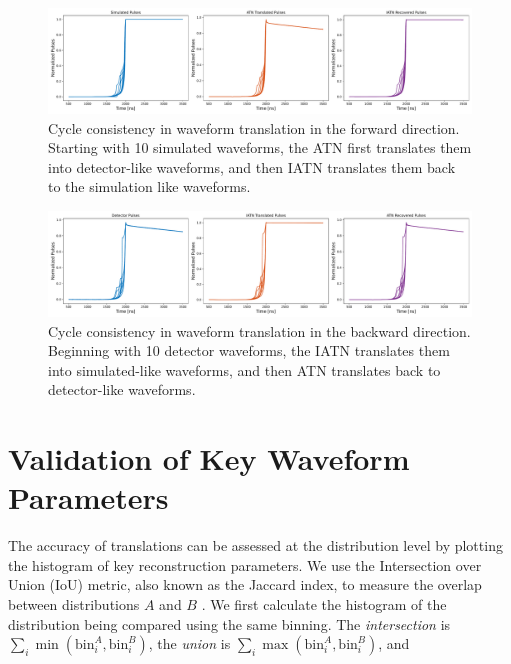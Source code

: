 \begin{figure}%
    \centering
    \includegraphics[width=0.99\linewidth]{ch8/figs/SEP_result_comp_1x3_cycle_BAB.pdf}
    \caption{Cycle consistency in waveform translation in the forward direction. Starting with 10 simulated waveforms, the ATN first translates them into detector-like waveforms, and then IATN translates them back to the simulation like waveforms.}
    \label{fig:cycle_bab}
\end{figure}

\begin{figure}%
    \centering
    \includegraphics[width=0.99\linewidth]{ch8/figs/SEP_result_comp_1x3_cycle_ABA.pdf}
    \caption{Cycle consistency in waveform translation in the backward direction. Beginning with 10 detector waveforms, the IATN translates them into simulated-like waveforms, and then ATN translates back to detector-like waveforms.}
    \label{fig:cycle_aba}
\end{figure}

\section{Validation of Key Waveform Parameters}
 The accuracy of translations can be assessed at the distribution level by plotting the histogram of key reconstruction parameters. We use the Intersection over Union (IoU) metric, also known as the Jaccard index, to measure the overlap between distributions $A$ and $B$ \cite{murphy1996finley, jaccard_index}. We first calculate the histogram of the distribution being compared using the same binning. The \textit{intersection} is $\sum_{i} \min(\text{bin}_i^A, \text{bin}_i^B)$, the \textit{union} is $\sum_{i} \max(\text{bin}_i^A, \text{bin}_i^B)$, and
 
